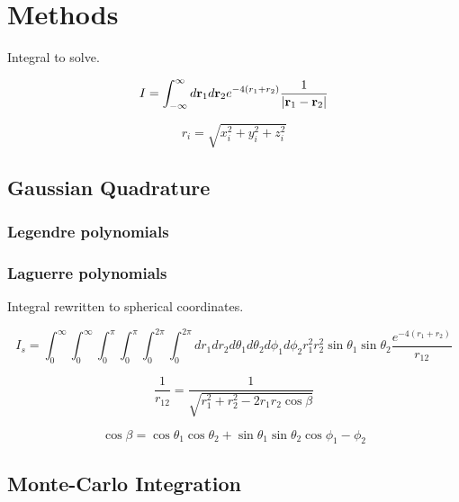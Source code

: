 \section{Methods}

Integral to solve.

\begin{equation}
  \label{eq:int}
  I = \int_{-\infty}^{\infty} d\mathbf{r}_1 d\mathbf{r}_2 e^{-4(r_1+r_2)}
  \frac{1}{\abs{\mathbf{r}_1 - \mathbf{r}_2}}
\end{equation}

\begin{equation}
  \label{eq:distance}
r_i = \sqrt{x_i^2 + y_i^2 + z_i^2}
\end{equation}


\subsection{Gaussian Quadrature}

\subsubsection{Legendre polynomials}\label{sec:legendre}


\subsubsection{Laguerre polynomials}


Integral rewritten to spherical coordinates.

\begin{equation}
  \label{eq:int_spherical}
  I_s = \int_{0}^{\infty} \int_{0}^{\infty} \int_{0}^{\pi} \int_{0}^{\pi}
  \int_{0}^{2\pi} \int_{0}^{2\pi}
  dr_1 dr_2 d\theta_1 d\theta_2 d\phi_1 d\phi_2
  r_1^2 r_2^2 \sin{\theta_1} \sin{\theta_2} \frac{e^{-4(r_1 + r_2)}}{r_{12}}
\end{equation}

\begin{equation}
  \label{eq:distance_spherical}
  \frac{1}{r_{12}} = \frac{1}{\sqrt{r_1^2 + r_2^2 - 2r_1r_2 \cos{\beta}}}
\end{equation}

\begin{equation}
  \label{eq:cos_beta}
  \cos{\beta} = \cos{\theta_1} \cos{\theta_2} + \sin{\theta_1} \sin{\theta_2}
  \cos{\phi_1 -\phi_2}
\end{equation}

\subsection{Monte-Carlo Integration}

